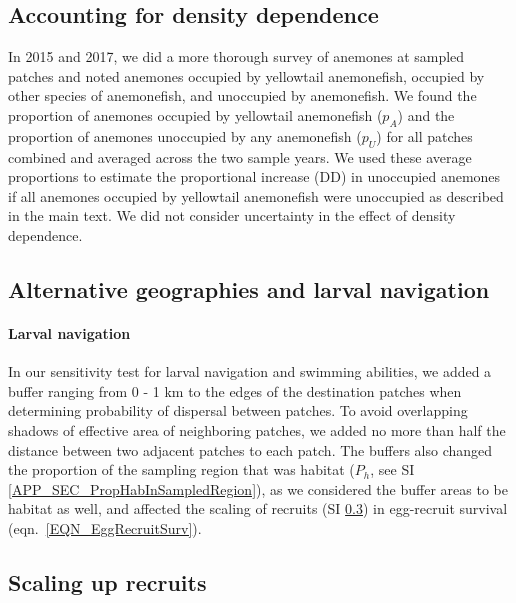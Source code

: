 \documentclass[12pt, oneside]{article}   	%
\begin{document}

\subsection{Accounting for density dependence} \label{APP_SEC_METHODS_DD}

In 2015 and 2017, we did a more thorough survey of anemones at sampled patches and noted anemones occupied by yellowtail anemonefish, occupied by other species of anemonefish, and unoccupied by anemonefish. We found the proportion of anemones occupied by yellowtail anemonefish ($p_A$) and the proportion of anemones unoccupied by any anemonefish ($p_U$) for all patches combined and averaged across the two sample years. We used these average proportions to estimate the proportional increase (DD) in unoccupied anemones if all anemones occupied by yellowtail anemonefish were unoccupied as described in the main text. We did not consider uncertainty in the effect of density dependence.

\subsection{Alternative geographies and larval navigation}

\paragraph{Larval navigation} \label{APP_SEC_METHODS_Larval_nav}

In our sensitivity test for larval navigation and swimming abilities, we added a buffer ranging from 0 - 1 km to the edges of the destination patches when determining probability of dispersal between patches. To avoid overlapping shadows of effective area of neighboring patches, we added no more than half the distance between two adjacent patches to each patch. The buffers also changed the proportion of the sampling region that was habitat ($P_h$, see SI \ref{APP_SEC_PropHabInSampledRegion}), as we considered the buffer areas to be habitat as well, and affected the scaling of recruits (SI \ref{APP_SEC_METHODS_ScalingUpRecruits}) in egg-recruit survival (eqn.\ \ref{EQN_EggRecruitSurv}).

\subsection{Scaling up recruits} \label{APP_SEC_METHODS_ScalingUpRecruits}
\end{document}
